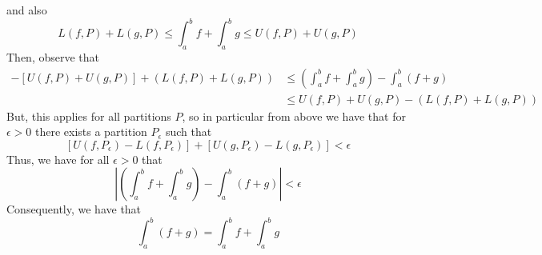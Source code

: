 \documentclass[12pt]{report}
\begin{document}
\begin{proof*}{}{}
    and also \begin{equation*}
        L(f,P) + L(g,P) \leq \int_a^bf + \int_a^bg \leq U(f,P) + U(g,P)
    \end{equation*}
    Then, observe that \begin{align*}
        -[U(f,P) + U(g,P)] + (L(f,P) +L(g,P)) &\leq \left(\int_a^bf+\int_a^bg\right) - \int_a^b(f+g)\\
        &\leq U(f,P) + U(g,P) - (L(f,P) +L(g,P))
    \end{align*}
    But, this applies for all partitions $P$, so in particular from above we have that for $\epsilon > 0$ there exists a partition $P_{\epsilon}$ such that $$[U(f,P_{\epsilon}) - L(f,P_{\epsilon})] + [U(g,P_{\epsilon}) - L(g,P_{\epsilon})] < \epsilon$$
    Thus, we have for all $\epsilon > 0$ that \begin{equation*}
        \left|\left(\int_a^bf+\int_a^bg\right) - \int_a^b(f+g)\right| < \epsilon
    \end{equation*}
    Consequently, we have that \begin{equation*}
        \int_a^b(f+g) = \int_a^bf + \int_a^bg
    \end{equation*}
\end{proof*}
\end{document}
